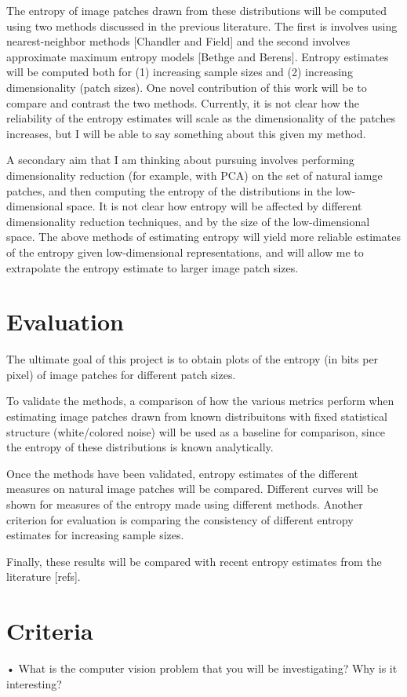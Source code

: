 \documentclass[10pt,twocolumn,letterpaper]{article}
\begin{document}
The entropy of image patches drawn from these distributions will be computed using two methods discussed in the previous literature. The first is involves using nearest-neighbor methods [Chandler and Field] and the second involves approximate maximum entropy models [Bethge and Berens]. Entropy estimates will be computed both for (1) increasing sample sizes and (2) increasing dimensionality (patch sizes). One novel contribution of this work will be to compare and contrast the two methods. Currently, it is not clear how the reliability of the entropy estimates will scale as the dimensionality of the patches increases, but I will be able to say something about this given my method.

A secondary aim that I am thinking about pursuing involves performing dimensionality reduction (for example, with PCA) on the set of natural iamge patches, and then computing the entropy of the distributions in the low-dimensional space. It is not clear how entropy will be affected by different dimensionality reduction techniques, and by the size of the low-dimensional space. The above methods of estimating entropy will yield more reliable estimates of the entropy given low-dimensional representations, and will allow me to extrapolate the entropy estimate to larger image patch sizes.

\section{Evaluation}
The ultimate goal of this project is to obtain plots of the entropy (in bits per pixel) of image patches for different patch sizes.

To validate the methods, a comparison of how the various metrics perform when estimating image patches drawn from known distribuitons with fixed statistical structure (white/colored noise) will be used as a baseline for comparison, since the entropy of these distributions is known analytically.

Once the methods have been validated, entropy estimates of the different measures on natural image patches will be compared. Different curves will be shown for measures of the entropy made using different methods. Another criterion for evaluation is comparing the consistency of different entropy estimates for increasing sample sizes.

Finally, these results will be compared with recent entropy estimates from the literature [refs].

\section{Criteria}
• What is the computer vision problem that you will be investigating? Why is it interesting?
\end{document}
